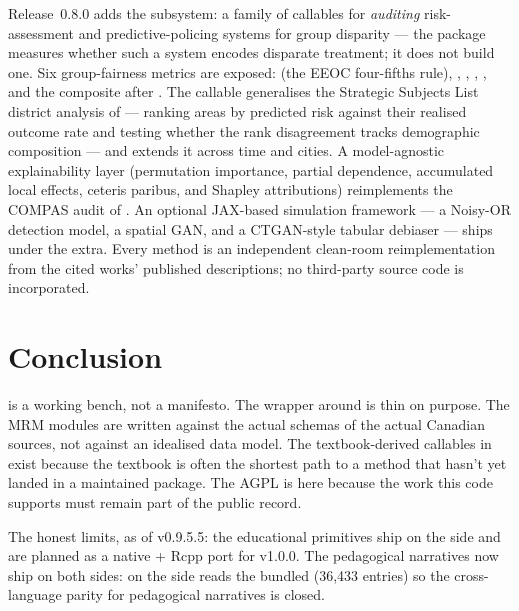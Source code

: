 \documentclass[article,shortnames,nojss]{jss}
\begin{document}
Release~0.8.0 adds the  subsystem: a family of
callables for \emph{auditing} risk-assessment and predictive-policing
systems for group disparity --- the package measures whether such a
system encodes disparate treatment; it does not build one.  Six
group-fairness metrics are exposed: 
(the EEOC four-fifths rule), ,
, ,
, and the composite
 after
\citet{Barman2026PredictivePolicingBias}.  The
 callable generalises the Strategic
Subjects List district analysis of \citet{Lacherade2021PredPolChicago}
--- ranking areas by predicted risk against their realised outcome
rate and testing whether the rank disagreement tracks demographic
composition --- and  extends it across
time and cities.  A model-agnostic explainability layer (permutation
importance, partial dependence, accumulated local effects, ceteris
paribus, and Shapley attributions) reimplements the COMPAS audit of
\citet{Biecek2021XAIStories}.  An optional JAX-based simulation
framework --- a Noisy-OR detection model, a spatial GAN, and a
CTGAN-style tabular debiaser --- ships under the 
extra.  Every method is an independent clean-room reimplementation
from the cited works' published descriptions; no third-party source
code is incorporated.

\section{Conclusion}
\label{sec:conclusion}

 is a working bench, not a manifesto. The wrapper
around  is thin on purpose. The MRM modules are
written against the actual schemas of the actual Canadian
sources, not against an idealised data model. The
textbook-derived callables in  exist because the
textbook is often the shortest path to a method that hasn't yet
landed in a maintained package. The AGPL is here because the
work this code supports must remain part of the public record.

The honest limits, as of v0.9.5.5: the 
educational primitives ship on the  side and
are planned as a native  + Rcpp port for v1.0.0.
The  pedagogical narratives now ship on
both sides:  on the  side
reads the bundled  (36{,}433
entries) so the cross-language parity for pedagogical
narratives is closed.
\end{document}
